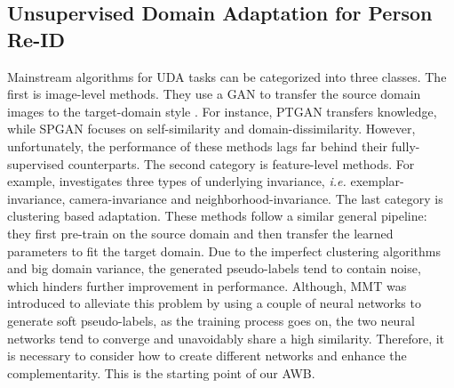 \documentclass[journal]{IEEEtran}
\begin{document}
\subsection{Unsupervised Domain Adaptation for Person Re-ID}
Mainstream algorithms for UDA tasks can be categorized into three classes. The first is image-level methods. They use a GAN to transfer the source domain images to the target-domain style \cite{ye2020deep}. For instance, PTGAN \cite{wei2018person} transfers knowledge, while SPGAN \cite{deng2018image} focuses on self-similarity and domain-dissimilarity. However, unfortunately, the performance of these methods lags far behind their fully-supervised counterparts. The second category is feature-level methods. For example, \cite{zhong2019invariance} investigates three types of underlying invariance, \textit{i.e.} exemplar-invariance, camera-invariance and neighborhood-invariance. The last category is clustering based adaptation. These methods \cite{fan2018unsupervised, lin2019bottom, zhang2019self,fu2019self} follow a similar general pipeline: they first pre-train on the source domain and then transfer the learned parameters to fit the target domain. Due to the imperfect clustering algorithms and big domain variance, the generated pseudo-labels tend to contain noise, which hinders further improvement in performance. Although, MMT \cite{ge2020mutual} was introduced to alleviate this problem by using a couple of neural networks to generate soft pseudo-labels, as the training process goes on, the two neural networks tend to converge and unavoidably share a high similarity. Therefore, it is necessary to consider how to create different networks and enhance the complementarity. This is the starting point of our AWB.
\end{document}
